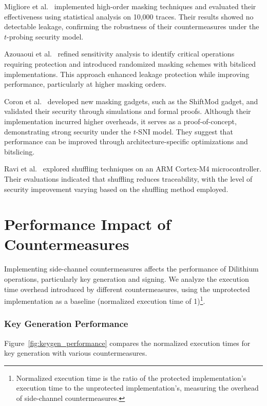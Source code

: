 Migliore et al.~\cite{Migliore19} implemented high-order masking techniques and evaluated their effectiveness using statistical analysis on 10,000 traces. Their results showed no detectable leakage, confirming the robustness of their countermeasures under the $t$-probing security model.

Azouaoui et al.~\cite{Azouaoui22} refined sensitivity analysis to identify critical operations requiring protection and introduced randomized masking schemes with bitsliced implementations. This approach enhanced leakage protection while improving performance, particularly at higher masking orders.

Coron et al.~\cite{Coron23} developed new masking gadgets, such as the ShiftMod gadget, and validated their security through simulations and formal proofs. Although their implementation incurred higher overheads, it serves as a proof-of-concept, demonstrating strong security under the $t$-SNI model. They suggest that performance can be improved through architecture-specific optimizations and bitslicing.

Ravi et al.~\cite{Ravi20} explored shuffling techniques on an ARM Cortex-M4 microcontroller. Their evaluations indicated that shuffling reduces traceability, with the level of security improvement varying based on the shuffling method employed.

\section{Performance Impact of Countermeasures}

Implementing side-channel countermeasures affects the performance of Dilithium operations, particularly key generation and signing. We analyze the execution time overhead introduced by different countermeasures, using the unprotected implementation as a baseline (normalized execution time of 1)\footnote{Normalized execution time is the ratio of the protected implementation's execution time to the unprotected implementation's, measuring the overhead of side-channel countermeasures.}.

\subsubsection{Key Generation Performance}

Figure~\ref{fig:keygen_performance} compares the normalized execution times for key generation with various countermeasures.

